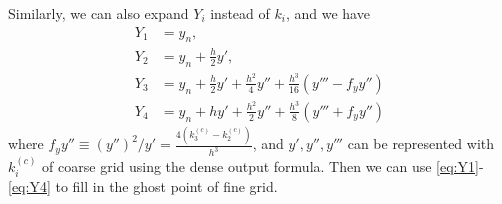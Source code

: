 \documentclass[prd,aps,a4paper,superscriptaddress,onecolumn,footinbib]{revtex4}
\begin{document}
Similarly, we can also expand $Y_i$ instead of $k_i$, and we have
\begin{align}
    Y_1&=y_n, \label{eq:Y1} \\
    Y_2&=y_n + \frac{h}{2}y', \label{eq:Y2} \\
    Y_3&=y_n + \frac{h}{2}y' + \frac{h^2}{4}y''+\frac{h^3}{16}(y'''-f_yy'') \label{eq:Y3} \\
    Y_4&=y_n + hy' + \frac{h^2}{2}y''+\frac{h^3}{8}(y'''+f_yy'') \label{eq:Y4}
\end{align}
where $f_yy''\equiv\left(y''\right)^2/y'=\frac{4(k^{(c)}_3-k^{(c)}_2)}{h^3}$,
and $y',y'',y'''$ can be represented with $k^{(c)}_i$ of coarse grid using the dense output formula.
Then we can use \eqref{eq:Y1}-\eqref{eq:Y4} to fill in the ghost point of fine grid.




%
%
\end{document}
